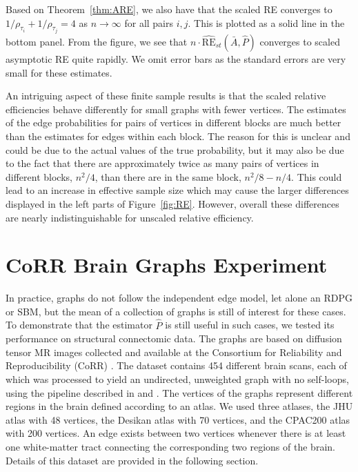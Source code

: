 Based on Theorem~\ref{thm:ARE}, we also have that the scaled RE converges to $1/\rho_{\tau_i}+1/\rho_{\tau_j}=4$ as $n \to\infty$ for all pairs $i,j$.
This is plotted as a solid line in the bottom panel.
From the figure, we see that $n \cdot \hat{\mathrm{RE}}_{st}(\bar{A}, \hat{P})$ converges to scaled asymptotic RE quite rapidly.
We omit error bars as the standard errors are very small for these estimates.

\begin{remark}
An intriguing aspect of these finite sample results is that the scaled relative efficiencies behave differently for small graphs with fewer vertices. 
The estimates of the edge probabilities for pairs of vertices in different blocks are much better than the estimates for edges within each block.
The reason for this is unclear and could be due to the actual values of the true probability, but it may also be due to the fact that there are approximately twice as many pairs of vertices in different blocks, $n^2/4$, than there are in the same block, $n^2/8-n/4$.
This could lead to an increase in effective sample size which may cause the larger differences displayed in the left parts of Figure~\ref{fig:RE}.
However, overall these differences are nearly indistinguishable for unscaled relative efficiency.
\end{remark}






\section{CoRR Brain Graphs Experiment}
\label{sec:LLG_corr_data}

In practice, graphs do not follow the independent edge model, let alone an RDPG or SBM, but the mean of a collection of graphs is still of interest for these cases.
To demonstrate that the estimator $\hat{P}$ is still useful in such cases, we tested its performance on structural connectomic data. 
The graphs are based on diffusion tensor MR images collected and available at the Consortium for Reliability and Reproducibility (CoRR) \citep{zuo2014open, gorgolewski2015high}.
The dataset contains 454 different brain scans, each of which was processed to yield an undirected, unweighted graph with no self-loops, using the pipeline described in \citet{roncal2013migraine} and \citet{kiar2016m2g}.
The vertices of the graphs represent different regions in the brain defined according to an atlas.
We used three atlases, the JHU atlas with 48 vertices, the Desikan atlas with 70 vertices, and the  CPAC200 atlas with 200 vertices.
An edge exists between two vertices whenever there is at least one white-matter tract connecting the corresponding two regions of the brain. 
Details of this dataset are provided in the following section.



